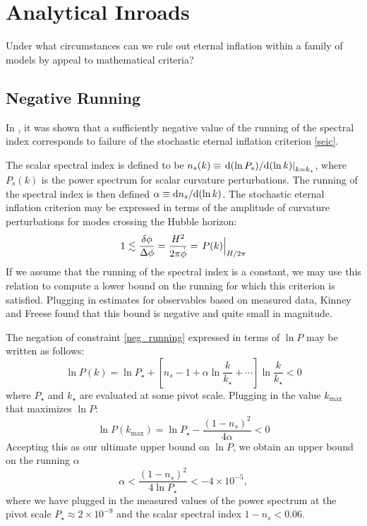 \section{Analytical Inroads}

Under what circumstances can we rule out eternal inflation within a family of models by appeal to mathematical criteria?

\subsection{Negative Running}

In \cite{kinneyfreese15}, it was shown that a sufficiently negative value of the running of the spectral index corresponds to failure of the stochastic eternal inflation criterion \eqref{seic}.

The scalar spectral index is defined to be $ n_s(k) \equiv \left. \mathrm d({\ln P_s})/\mathrm d({\ln k}) \right\rvert_{k=k_\star}$, 
where $P_s(k)$ is the power spectrum for scalar curvature perturbations.
The running of the spectral index is then defined
$ \alpha \equiv \mathrm d{n_s}/\mathrm d({\ln k}) $.
The stochastic eternal inflation criterion may be expressed in terms of the amplitude of curvature perturbations for modes crossing the Hubble horizon:
\begin{equation} 1 \lesssim \frac{\delta\phi}{\Delta\phi} = \frac{H^2}{2\pi \dot\phi} = \left. \vphantom{\sum} P(k) \right\rvert_{H/2\pi} \label{neg_running} \end{equation}
If we assume that the running of the spectral index is a constant, we may use this relation to compute a lower bound on the running for which this criterion is satisfied.  Plugging in estimates for observables based on measured data, Kinney and Freese found that this bound is negative and quite small in magnitude.

The negation of constraint \eqref{neg_running} expressed in terms of $\ln P$ may be written as follows:
\[ \ln P(k) = \ln P_\star + \left[ n_s -1 + \alpha \ln \frac{k}{k_\star} + \cdots \right] \ln \frac{k}{k_\star} < 0 \]
where $P_\star$ and $k_\star$ are evaluated at some pivot scale.  Plugging in the value $k_\text{max}$ that maximizes $\ln P$:
\[ \ln P(k_\text{max}) = \ln P_\star - \frac{(1-n_s)^2}{4\alpha} < 0 \]
Accepting this as our ultimate upper bound on $\ln P$, we obtain an upper bound on the running $\alpha$
\[ \alpha < \frac{(1-n_s)^2}{4\ln P_\star} < -4 \times 10^{-5}, \]
where we have plugged in the measured values of the power spectrum at the pivot scale $P_\star \approx 2 \times 10^{-9}$ and the scalar spectral index $1 - n_s < 0.06$.

